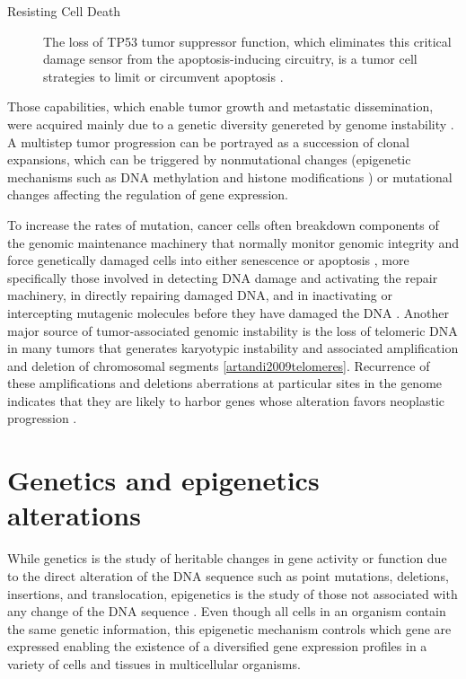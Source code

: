 \begin{description}
    \item[Resisting Cell Death]
    The loss of TP53 tumor suppressor function, which eliminates this critical damage sensor from the apoptosis-inducing circuitry, is a tumor cell strategies to limit or circumvent apoptosis \cite{hanahan2011hallmarks}.
\end{description}

Those capabilities, which enable tumor growth and metastatic dissemination, were acquired mainly due to a genetic diversity
 genereted  by genome instability \cite{hanahan2011hallmarks}.
 A multistep tumor progression can be portrayed as
a succession of clonal expansions, which can be triggered
by nonmutational changes (epigenetic mechanisms such as DNA methylation and histone modifications \cite{berdasco2010aberrant})
or mutational changes affecting the regulation of gene expression.

To increase  the rates of mutation, cancer cells often breakdown components of the genomic maintenance machinery
that normally monitor genomic integrity and force genetically damaged cells into either senescence or apoptosis \cite{jackson2009dna}, more specifically those involved in detecting DNA damage and activating the repair machinery, in directly repairing damaged DNA, and in inactivating or intercepting mutagenic molecules before they have damaged the DNA \cite{negrini2010genomic}. Another major source of tumor-associated genomic instability is the loss of telomeric DNA  in many tumors that generates karyotypic instability and associated amplification and deletion of chromosomal segments \ref{artandi2009telomeres}.  Recurrence  of these amplifications and deletions aberrations at particular sites in the genome
indicates that they are likely to harbor genes whose alteration favors neoplastic progression \cite{korkola2010breast}.


\section{Genetics and epigenetics alterations} \label{sec:concept-alteration}

While genetics is the study of heritable changes in gene activity or function due
to the direct alteration of the DNA sequence such as point mutations, deletions,
insertions, and translocation, epigenetics is the study of  those not associated with any change of the DNA sequence \cite{moore2013dna}.
Even though all cells in an organism contain the same genetic information,
this epigenetic mechanism controls which gene are expressed enabling the existence of
a diversified gene expression profiles
in a variety of cells and tissues in multicellular organisms.



